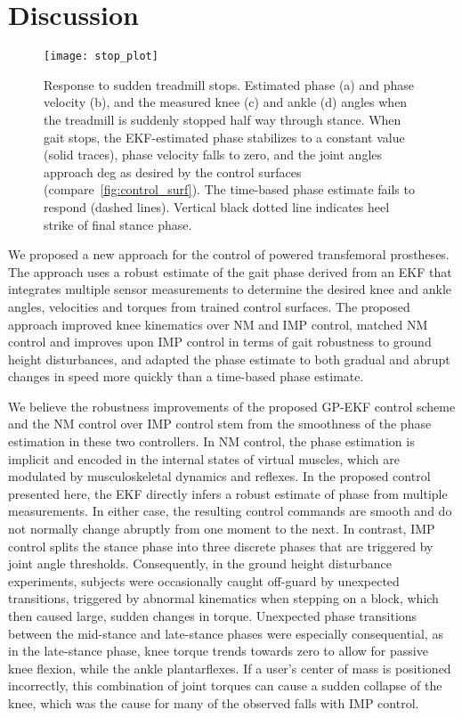 \section{Discussion}\label{sec:discussion}
\begin{figure}[t!]
    \centering
    \texttt{[image: stop\_plot]} 
    \caption{Response to sudden treadmill stops. Estimated phase (a) and phase
    velocity (b), and the measured knee (c) and ankle (d) angles when the
    treadmill is suddenly stopped half way through stance.  When gait stops, the
    EKF-estimated phase stabilizes to a constant value (solid traces), phase
    velocity falls to zero, and the joint angles approach \unit[5]{deg} as
    desired by the control surfaces (compare~\cref{fig:control_surf}). The
    time-based phase estimate fails to respond (dashed lines). Vertical black
    dotted line indicates heel strike of final stance
    phase.}\label{fig:stop_plot}
\end{figure}

We proposed a new approach for the control of powered transfemoral prostheses.
The approach uses a robust estimate of the gait phase derived from an EKF that
integrates multiple sensor measurements to determine the desired knee and ankle
angles, velocities and torques from trained control surfaces. The proposed
approach improved knee kinematics over NM and IMP control, matched NM control
and improves upon IMP control in terms of gait robustness to ground height
disturbances, and adapted the phase estimate to both gradual and abrupt changes
in speed more quickly than a time-based phase estimate.

We believe the robustness improvements of the proposed GP-EKF control scheme and
the NM control over IMP control stem from the smoothness of the phase estimation
in these two controllers. In NM control, the phase estimation is implicit and
encoded in the internal states of virtual muscles, which are modulated by
musculoskeletal dynamics and reflexes. In the proposed control presented here,
the EKF directly infers a robust estimate of phase from multiple measurements.
In either case, the resulting control commands are smooth and do not normally
change abruptly from one moment to the next. In contrast, IMP control splits the
stance phase into three discrete phases that are triggered by joint angle
thresholds.  Consequently, in the ground height disturbance experiments,
subjects were occasionally caught off-guard by unexpected transitions, triggered
by abnormal kinematics when stepping on a block, which then caused large, sudden
changes in torque. Unexpected phase transitions between the mid-stance and
late-stance phases were especially consequential, as in the late-stance phase,
knee torque trends towards zero to allow for passive knee flexion, while the
ankle plantarflexes. If a user's center of mass is positioned incorrectly, this
combination of joint torques can cause a sudden collapse of the knee, which was
the cause for many of the observed falls with IMP control. 

